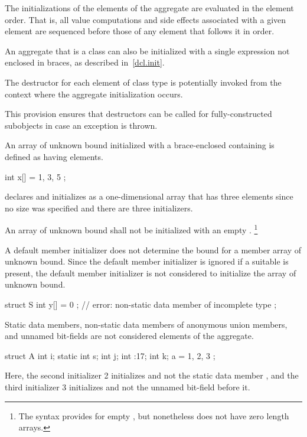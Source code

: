 \pnum
The initializations of the elements of the aggregate
are evaluated in the element order.
That is,
all value computations and side effects associated with a given element
are sequenced before
those of any element that follows it in order.

\pnum
An aggregate that is a class can also be initialized with a single
expression not enclosed in braces, as described in~\ref{dcl.init}.

\pnum
The destructor for each element of class type
is potentially invoked
from the context where the aggregate initialization occurs.
\begin{note}
This provision ensures that destructors can be called
for fully-constructed subobjects
in case an exception is thrown.
\end{note}

\pnum
An array of unknown bound initialized with a
brace-enclosed
containing
is defined as having
elements.
\begin{example}
\begin{codeblock}
int x[] = { 1, 3, 5 };
\end{codeblock}
declares and initializes
as a one-dimensional array that has three elements
since no size was specified and there are three initializers.
\end{example}
An array of unknown bound shall not be initialized with
an empty  \tcode{\{\}}.%
\footnote{The syntax provides for empty ,
but nonetheless \Cpp{} does not have zero length arrays.}
\begin{note}
A default member initializer does not determine the bound for a member
array of unknown bound.  Since the default member initializer is
ignored if a suitable  is present,
the default member initializer is not
considered to initialize the array of unknown bound.
\begin{example}
\begin{codeblock}
struct S {
  int y[] = { 0 };          // error: non-static data member of incomplete type
};
\end{codeblock}
\end{example}
\end{note}

\pnum
\begin{note}
Static data members,
non-static data members of anonymous union members,
and
unnamed bit-fields
are not considered elements of the aggregate.
\begin{example}
\begin{codeblock}
struct A {
  int i;
  static int s;
  int j;
  int :17;
  int k;
} a = { 1, 2, 3 };
\end{codeblock}

Here, the second initializer 2 initializes
and not the static data member
, and the third initializer 3 initializes 
and not the unnamed bit-field before it.
\end{example}
\end{note}


